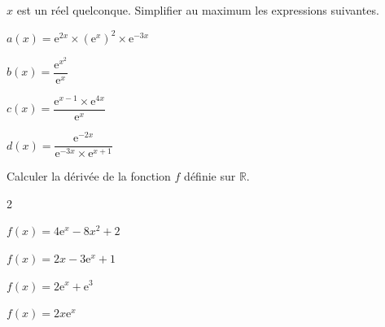\documentclass[12pt,a4paper]{article}  %
\begin{document}
$x$ est un réel quelconque. Simplifier au maximum les expressions suivantes.
\begin{enumMet}
	\item $a(x)=\mathrm{e}^{2 x} \times\left(\mathrm{e}^x\right)^2 \times \mathrm{e}^{-3 x}$ \quad {} 
	\item $b(x)=\dfrac{\mathrm{e}^{x^2}}{\mathrm{e}^x}$\quad {}
	\item $c(x)=\dfrac{\mathrm{e}^{x-1} \times \mathrm{e}^{4 x}}{\mathrm{e}^x}$\quad {}
	\item {} $d(x)=\dfrac{\mathrm{e}^{-2 x}}{\mathrm{e}^{-3 x} \times \mathrm{e}^{x+1}}$\quad {}
\end{enumMet}

Calculer la dérivée de la fonction $f$ définie sur $\mathbb{R}$.
\begin{multicols}{2}
	\begin{enumMet}
		\item $f(x)=4 \mathrm{e}^x-8 x^2+2$ \quad {}
		\item {} $f(x)=2x-3 \mathrm{e}^x+1$ \quad {}
		\item $f(x)=2\mathrm{e}^x+\mathrm{e}^3$ \quad {}
		\item $f(x)=2x \mathrm{e}^x$ \quad {}
	\end{enumMet}
\end{multicols}
\end{document}

